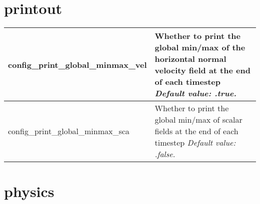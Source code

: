 \section{printout}

{\small
\begin{longtable}{|p{2.0in} |p{4.25in}|}
 \hline
   config\_print\_global\_minmax\_vel & Whether to print the global min/max of the horizontal normal velocity field at the end of each timestep \newline 
   {\em Default value: .true.} \\ \hline

   config\_print\_global\_minmax\_sca & Whether to print the global min/max of scalar fields at the end of each timestep \newline 
   {\em Default value: .false.} \\ \hline    
\end{longtable}
}
         
\section{physics}

